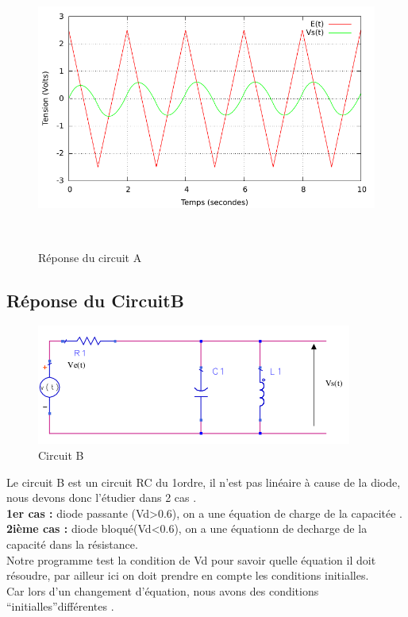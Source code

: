 \documentclass[a4paper,11pt]{article}
\begin{document}
\begin{figure}[h!]
\begin{minipage}[b]{0.5\linewidth}
   \end{minipage}
  \begin{minipage}[b]{0.5\linewidth}   
      \centering \includegraphics[scale=.68]{CAtriangle.pdf}
   \end{minipage}\\
 \caption{Réponse du circuit A}
\end{figure}

\newpage
  \subsection{Réponse du CircuitB}
  
\begin{figure}[H]
	 \begin{center}
	\includegraphics[scale=.7]{circuitTest}
	\caption{Circuit B}
	\end{center}
      \end{figure}
   Le circuit B est un circuit RC du 1\ier ordre, il n'est pas linéaire à cause de la diode, nous devons donc l'étudier dans 2 cas .\\
   \textbf{1er cas :} diode passante (Vd>0.6), on a une équation de charge de la capacitée .\\
   \textbf{2ième cas :} diode bloqué(Vd<0.6), on a une équationn de decharge de la capacité dans la résistance.\\
   Notre programme test la condition de Vd pour savoir quelle équation il doit résoudre, par ailleur ici on doit prendre en compte les conditions initialles.\\
   Car lors d'un changement d'équation, nous avons des conditions ``initialles''différentes .\\
\end{document}
